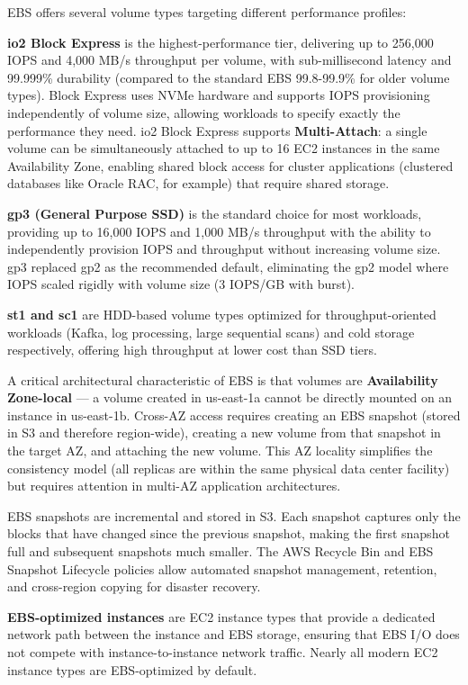 EBS offers several volume types targeting different performance profiles:

\textbf{io2 Block Express} is the highest-performance tier, delivering up to 256,000 IOPS and 4,000 MB/s throughput per volume, with sub-millisecond latency and 99.999\% durability (compared to the standard EBS 99.8-99.9\% for older volume types). Block Express uses NVMe hardware and supports IOPS provisioning independently of volume size, allowing workloads to specify exactly the performance they need. io2 Block Express supports \textbf{Multi-Attach}: a single volume can be simultaneously attached to up to 16 EC2 instances in the same Availability Zone, enabling shared block access for cluster applications (clustered databases like Oracle RAC, for example) that require shared storage.

\textbf{gp3 (General Purpose SSD)} is the standard choice for most workloads, providing up to 16,000 IOPS and 1,000 MB/s throughput with the ability to independently provision IOPS and throughput without increasing volume size. gp3 replaced gp2 as the recommended default, eliminating the gp2 model where IOPS scaled rigidly with volume size (3 IOPS/GB with burst).

\textbf{st1 and sc1} are HDD-based volume types optimized for throughput-oriented workloads (Kafka, log processing, large sequential scans) and cold storage respectively, offering high throughput at lower cost than SSD tiers.

A critical architectural characteristic of EBS is that volumes are \textbf{Availability Zone-local} --- a volume created in us-east-1a cannot be directly mounted on an instance in us-east-1b. Cross-AZ access requires creating an EBS snapshot (stored in S3 and therefore region-wide), creating a new volume from that snapshot in the target AZ, and attaching the new volume. This AZ locality simplifies the consistency model (all replicas are within the same physical data center facility) but requires attention in multi-AZ application architectures.

EBS snapshots are incremental and stored in S3. Each snapshot captures only the blocks that have changed since the previous snapshot, making the first snapshot full and subsequent snapshots much smaller. The AWS Recycle Bin and EBS Snapshot Lifecycle policies allow automated snapshot management, retention, and cross-region copying for disaster recovery.

\textbf{EBS-optimized instances} are EC2 instance types that provide a dedicated network path between the instance and EBS storage, ensuring that EBS I/O does not compete with instance-to-instance network traffic. Nearly all modern EC2 instance types are EBS-optimized by default.

